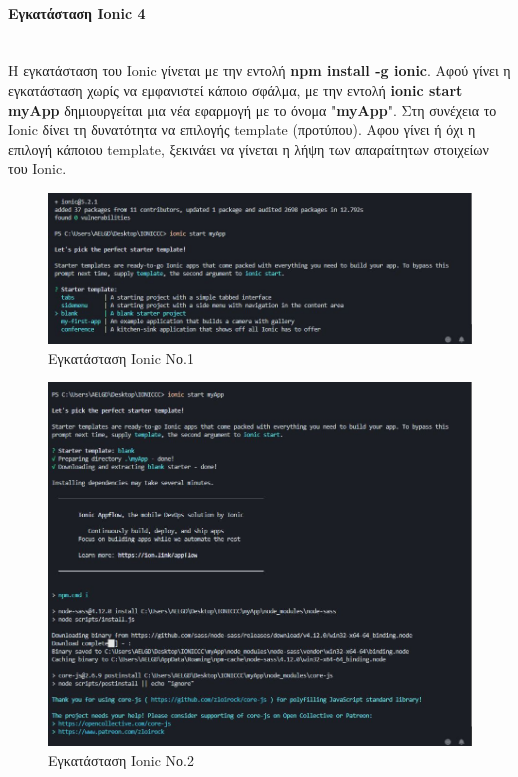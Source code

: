\documentclass[a4paper,12pt]{article}
\newcommand{\myparagraph}[1]{\paragraph{#1}\mbox{}\\}
\begin{document}
				\myparagraph{Εγκατάσταση Ionic 4} 
				Η εγκατάσταση του Ionic γίνεται με την εντολή \textbf{npm install -g ionic}.
				Αφού γίνει η εγκατάσταση χωρίς να εμφανιστεί κάποιο σφάλμα, με την εντολή \textbf{ionic start myApp} δημιουργείται μια νέα εφαρμογή με το 
				όνομα "\textbf{myApp}". Στη συνέχεια το Ionic  δίνει τη δυνατότητα να επιλογής template (προτύπου). Αφου γίνει ή όχι η επιλογή κάποιου template, 
				ξεκινάει να γίνεται η λήψη των απαραίτητων στοιχείων του Ionic.
				
				\begin{figure}[!htb]
					\begin{center}
						\caption{Εγκατάσταση Ionic Νο.1}
						\vspace*{0.5cm}

						\includegraphics[width=\linewidth]{ionic1} 
					\end{center}
				\end{figure}

				\begin{figure}[!htb]
				\begin{center}
					\caption{Εγκατάσταση Ionic Νο.2}
					\vspace*{0.5cm}
						\includegraphics[width=\linewidth]{ionic2} 
					\end{center}
				\end{figure}
\end{document}
